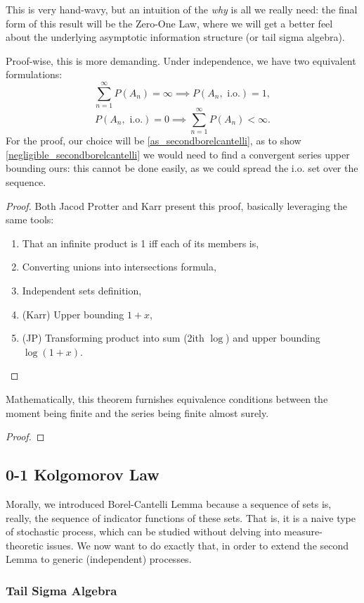 This is very hand-wavy, but an intuition of the \textit{why} is all we really need: the final form of this result will be the Zero-One Law, where we will get a better feel about the underlying asymptotic information structure (or tail sigma algebra).

Proof-wise, this is more demanding. Under independence, we have two equivalent formulations:
\begin{equation}
	\label{as_secondborelcantelli} 
	\sum_{n=1}^{\infty} P(A_n) = \infty \implies P(A_n,\text{ i.o.}) = 1,
\end{equation}
\begin{equation}
	\label{negligible_secondborelcantelli}
	P(A_n,\text{ i.o.}) = 0 \implies \sum_{n=1}^{\infty} P(A_n) < \infty.
\end{equation}
For the proof, our choice will be \ref{as_secondborelcantelli}, as to show \ref{negligible_secondborelcantelli} we would need to find a convergent series upper bounding ours: this cannot be done easily, as we could spread the i.o. set over the sequence.

\begin{proof}
	Both Jacod Protter and Karr present this proof, basically leveraging the same tools: 
	\begin{enumerate}
		\item That an infinite product is 1 iff each of its members is,
		\item Converting unions into intersections formula,
		\item Independent sets definition,
		\item (Karr) Upper bounding $1+x$,
		\item (JP) Transforming product into sum (2ith $\log$) and upper bounding $\log(1+x)$.
	\end{enumerate}
\end{proof}

Mathematically, this theorem furnishes equivalence conditions between the moment being finite and the series being finite almost surely.

\begin{proof}
	
\end{proof}

\subsection{0-1 Kolgomorov Law}

Morally, we introduced Borel-Cantelli Lemma because a sequence of sets is, really, the sequence of indicator functions of these sets. That is, it is a naive type of stochastic process, which can be studied without delving into measure-theoretic issues. We now want to do exactly that, in order to extend the second Lemma to generic (independent) processes.

\subsubsection{Tail Sigma Algebra}
